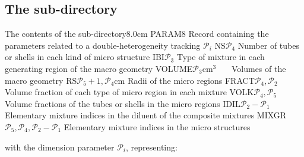\subsection{The  sub-directory}\label{sect:bihettrackingdir}

\vskip -0.3cm

\begin{DescriptionEnregistrement}{The contents of the
 sub-directory}{8.0cm}
\IntEnr
  {PARAM}{$8$}
  {Record containing the parameters related to a double-heterogeneity tracking
   $\mathcal{P}_{i}$} 
\IntEnr
  {NS}{$\mathcal{P}_{4}$}
  {Number of tubes or shells in each kind of micro structure}
\IntEnr
  {IBI}{$\mathcal{P}_{3}$}
  {Type of mixture in each generating region of the macro geometry}
\RealEnr
  {VOLUME}{$\mathcal{P}_{3}$}{cm$^3$~~~}
  {Volumes of the macro geometry}
\RealEnr
  {RS}{$\mathcal{P}_{5}+1,\mathcal{P}_{4}$}{cm}
  {Radii of the micro regions}
\RealEnr
  {FRACT}{$\mathcal{P}_{4},\mathcal{P}_{2}$}{}
  {Volume fraction of each type of micro region in each mixture}
\RealEnr
  {VOLK}{$\mathcal{P}_{4},\mathcal{P}_{5}$}{}
  {Volume fractions of the tubes or shells in the micro regions}
\IntEnr
  {IDIL}{$\mathcal{P}_{2}-\mathcal{P}_{1}$}
  {Elementary mixture indices in the diluent of the composite mixtures}
\IntEnr
  {MIXGR}{$\mathcal{P}_{5},\mathcal{P}_{4},\mathcal{P}_{2}-\mathcal{P}_{1}$}
  {Elementary mixture indices in the micro structures}
\end{DescriptionEnregistrement}

\noindent
with the dimension parameter $\mathcal{P}_{i}$, representing:

